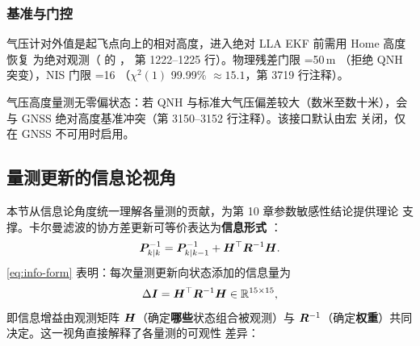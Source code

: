 \subsubsection{基准与门控}

气压计对外值是起飞点向上的相对高度，进入绝对 LLA EKF 前需用 Home 高度恢复
为绝对观测（ 的
， 第
1222--1225 行）。物理残差门限 =50\,m
（拒绝 QNH 突变），NIS 门限 =16
（$\chi^2(1)$ 99.99\% $\approx15.1$，第 3719 行注释）。

\begin{remark}
气压高度量测无零偏状态：若 QNH 与标准大气压偏差较大（数米至数十米），会与
GNSS 绝对高度基准冲突（第 3150--3152 行注释）。该接口默认由宏
 关闭，仅在 GNSS 不可用时启用。
\end{remark}

\subsection{量测更新的信息论视角}

本节从信息论角度统一理解各量测的贡献，为第 10 章参数敏感性结论提供理论
支撑。卡尔曼滤波的协方差更新可等价表达为\textbf{信息形式}
\cite{crassidis2011}：
\begin{equation}
  \boldsymbol{P}_{k|k}^{-1} = \boldsymbol{P}_{k|k-1}^{-1} + \boldsymbol{H}^{\top}\boldsymbol{R}^{-1}\boldsymbol{H}.
  \label{eq:info-form}
\end{equation}
\cref{eq:info-form} 表明：每次量测更新向状态添加的信息量为
\begin{equation}
  \Delta\boldsymbol{I} = \boldsymbol{H}^{\top}\boldsymbol{R}^{-1}\boldsymbol{H}
  \in \mathbb{R}^{15\times15},
  \label{eq:info-gain}
\end{equation}
即信息增益由观测矩阵 $\boldsymbol{H}$（确定\textbf{哪些}状态组合被观测）与
$\boldsymbol{R}^{-1}$（确定\textbf{权重}）共同决定。这一视角直接解释了各量测的可观性
差异：

